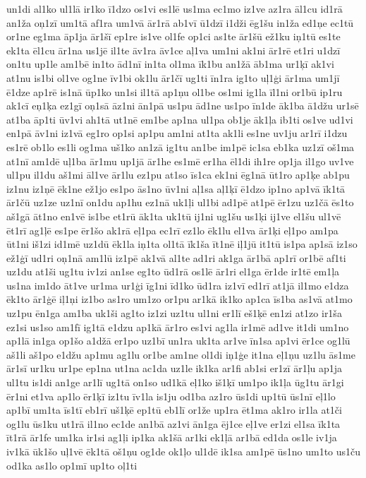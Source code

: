 {un1di
al1ko
ul1lā
ir1ko
ī1dzo
os1vi
es1lē
us1ma
ec1mo
iz1ve
az1ra
āl1cu
id1rā
an1ža
oņ1zī
um1tā
af1ra
um1vā
ār1rā
ab1vī
ū1dzī
i1dži
ēg1šu
in1ža
ed1ņe
ec1tū
or1ne
eg1ma
āp1ja
ār1šī
ep1re
is1ve
ol1fe
op1ci
as1te
ār1šū
ež1ku
iņ1tū
es1te
ek1ta
ēl1cu
ār1na
us1jē
il1te
āv1ra
āv1ce
aļ1va
um1ni
ak1ni
ār1rē
et1ri
u1dzī
on1tu
up1le
am1bē
in1to
ād1nī
in1ta
ol1ma
īk1bu
an1žā
āb1ma
ur1ķī
ak1vi
at1nu
is1bi
ol1ve
og1ne
īv1bi
ok1lu
ār1čī
ug1ti
īn1ra
ig1to
uļ1ģi
ār1ma
um1jī
ē1dze
ap1rē
is1nā
ūp1ko
un1si
il1tā
ap1ņu
ol1be
os1mi
ig1la
īl1ni
or1bū
ip1ru
ak1cī
eņ1ķa
ez1gī
oņ1sā
āz1ni
ān1pā
us1pu
ād1ne
us1po
īn1de
āk1ba
ā1džu
ur1sē
at1ba
āp1ti
ūv1vi
ah1tā
ut1nē
em1be
ap1na
ul1pa
ob1je
āk1ļa
ib1ti
os1ve
ud1vi
en1pā
āv1ni
iz1vā
eg1ro
op1si
ap1pu
am1ni
at1ta
ak1li
es1ne
uv1ju
ar1rī
i1dzu
es1rē
ob1lo
es1li
og1ma
uš1ko
an1zā
ig1tu
an1be
im1pē
ic1sa
eb1ka
uz1zī
oš1ma
at1nī
am1dē
uļ1ba
ār1mu
up1jā
ār1he
es1mē
er1ha
ēl1di
ih1re
op1ja
il1go
uv1ve
ul1pu
il1du
aš1mi
āl1ve
ār1lu
ez1pu
at1so
īs1ca
ek1ni
ēg1nā
ūt1ro
ap1ķe
ab1pu
iz1nu
iz1ņē
ēk1ne
ež1jo
es1po
ās1no
ūv1ni
aļ1sa
aļ1ķī
ē1dzo
ip1no
ap1vā
īk1tā
ār1čū
uz1ze
uz1nī
on1du
ap1hu
ez1nā
uk1ļi
ul1bi
ad1pē
at1pē
ēr1zu
uz1čā
ēs1to
aš1gā
āt1no
en1vē
is1be
et1rū
āk1ta
uk1tū
ij1ni
ug1šu
us1ķi
ij1ve
el1šu
ul1vē
ēt1rī
ag1ļē
es1pe
ēr1šo
ak1rā
eļ1pa
ec1rī
ez1lo
ēk1lu
el1va
ār1ķi
eļ1po
am1pa
ūt1ni
iš1zi
id1mē
uz1dū
ēk1la
iņ1ta
ol1tā
īk1ša
īt1nē
iļ1jū
it1tū
is1pa
ap1sā
iz1so
ež1ģī
ud1ri
oņ1nā
am1lū
iz1pē
ak1vā
al1te
ad1ri
ak1ga
ār1bā
ap1rī
or1bē
af1ti
uz1du
at1ši
ug1tu
iv1zi
an1se
eg1to
ūd1rā
os1lē
ār1ri
el1ga
ēr1de
ir1tē
em1ļa
us1na
im1do
āt1ve
ur1ma
ur1ģi
īg1ni
īd1ko
ūd1ra
iz1vī
ed1rī
at1jā
il1mo
e1dza
ēk1to
ār1ģē
iļ1ņi
iz1bo
as1ro
um1zo
or1pu
ar1kā
ik1ko
ap1ca
īs1ba
as1vā
at1mo
uz1pu
ēn1ga
am1ba
uk1ši
ag1to
iz1zi
uz1tu
ul1ni
er1lī
eš1ķē
en1zi
at1zo
ir1ša
ez1si
us1so
am1fī
ig1tā
e1dzu
ap1kā
ār1ro
es1vi
ag1la
ir1mē
ad1ve
it1di
um1no
ap1lā
in1ga
op1šo
a1džā
er1po
uz1bī
un1ra
uk1ta
ar1ve
īn1sa
ap1vi
ēr1ce
og1lū
aš1li
aš1po
e1džu
ap1mu
ag1lu
or1be
am1ne
ol1di
iņ1ģe
it1na
eļ1ņu
uz1lu
ās1me
ār1sī
ur1ku
ur1pe
ep1na
ut1na
ac1da
uz1le
ik1ka
ar1fi
ab1si
er1zī
ār1ļu
ap1ja
ul1tu
is1di
an1ge
ar1lī
ug1tā
on1so
ud1kā
eļ1ko
iš1ķī
um1po
ik1ļa
ūg1tu
ār1gi
ēr1ni
et1va
ap1lo
ēr1ķī
iz1tu
īv1la
is1ju
od1ba
az1ro
ūs1di
up1tū
ūs1nī
eļ1lo
ap1bī
um1ta
īs1tī
eb1rī
uš1ķē
ep1tū
eb1lī
or1že
up1ra
ēt1ma
ak1ro
ir1la
at1či
og1lu
ūs1ku
ut1rā
il1no
ec1de
an1bā
az1vi
ān1ga
ēj1ce
eļ1ve
er1zi
el1sa
īk1ta
īt1rā
ār1fe
um1ka
ir1si
ag1ļi
ip1ka
ak1šā
ar1ki
ek1ļā
ar1bā
ed1da
os1le
iv1ja
iv1kā
ūk1šo
uļ1vē
ēk1tā
oš1ņu
og1de
ok1ļo
ul1dē
ik1sa
am1pē
ūs1no
um1to
us1ču
od1ka
as1lo
op1mī
up1to
oļ1ti
}

